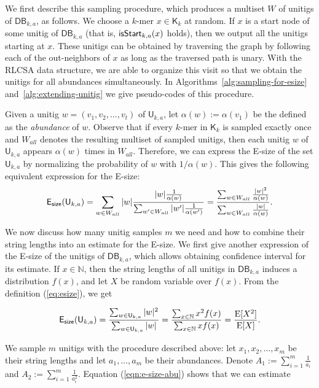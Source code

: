 \documentclass[a4paper,11pt]{article}
\newcommand{\DB}{\mathsf{DB}_{k,a}}
\newcommand{\U}{\mathsf{U}_{k,a}}
\newcommand{\K}{\mathsf{K}}
\newcommand{\abu}{\alpha}
\newcommand{\esize}{{\sf E_{size}}}
\newcommand{\isstart}{{\sf isStart}_{k,a}}
\newcommand{\E}{\text{E}}
\begin{document}
We first describe this sampling procedure, which produces a multiset $W$ of unitigs of $\DB$, as follows. We choose a $k$-mer $x \in \K_k$ at random. If $x$ is a start node of some unitig of $\DB$ (that is, $\isstart(x)$ holds), then we output all the unitigs starting at $x$. These unitigs can be obtained by traversing the graph by following each of the out-neighbors of $x$ as long as the traversed path is unary. With the RLCSA data structure, we are able to organize this visit so that we obtain the unitigs for all abundances simultaneously. In Algorithms~\ref{alg:sampling-for-esize} and~\ref{alg:extending-unitig} we give pseudo-codes of this procedure. 

Given a unitig $w = (v_1,v_2,\dots,v_t)$ of $\U$, let $\abu(w) := \abu(v_1)$ be the defined as the \emph{abundance} of $w$. Observe that if every $k$-mer in $\K_k$ is sampled exactly once and $W_{all}$ denotes the resulting multiset of sampled unitigs, then each unitig $w$ of $\U$ appears $\abu(w)$ times in $W_{all}$. Therefore, we can express the E-size of the set $\U$ by normalizing the probability of $w$ with $1/\abu(w)$. This gives the following equivalent expression for the E-size:
\begin{equation}
\esize(\U) = \sum_{w \in W_{all}} |w| \frac{|w|\frac{1}{\alpha(w)}}{\sum_{w' \in W_{all}}|w'|\frac{1}{\alpha(w')}} = \frac{\sum_{w \in W_{all}}\frac{|w|^2}{\alpha(w)}}{\sum_{w \in W_{all}}\frac{|w|}{\alpha(w)}}.
\label{eqn:e-size}
\end{equation}

We now discuss how many unitig samples $m$ we need and how to combine their string lengths into an estimate for the E-size. We first give another expression of the E-size of the unitigs of $\DB$, which allows obtaining confidence interval for its estimate. If $x \in \mathbb{N}$, then the string lengths of all unitigs in $\DB$ induces a distribution $f(x)$, and let $X$ be random variable over $f(x)$. From the definition (\ref{eq:esize}), we get

\begin{equation}
\esize(\U) = \frac{\sum_{w \in \U}|w|^2}{\sum_{w \in \U}|w|} = \frac{\sum_{x \in \mathbb{N}} x^2 f(x)}{\sum_{x \in \mathbb{N}} xf(x)} =  \frac{\E[X^2]}{\E[X]}.
\label{eqn:e-size-abu}
\end{equation}

We sample $m$ unitigs with the procedure described above: let $x_1,x_2,\dots,x_m$ be their string lengths and let $a_1,\dots,a_m$ be their abundances. Denote $A_1 := \sum_{i=1}^m \frac{1}{a_i}$ and $A_2 := \sum_{i=1}^m \frac{1}{a_i^2}$. Equation (\ref{eqn:e-size-abu}) shows that we can estimate
\end{document}
